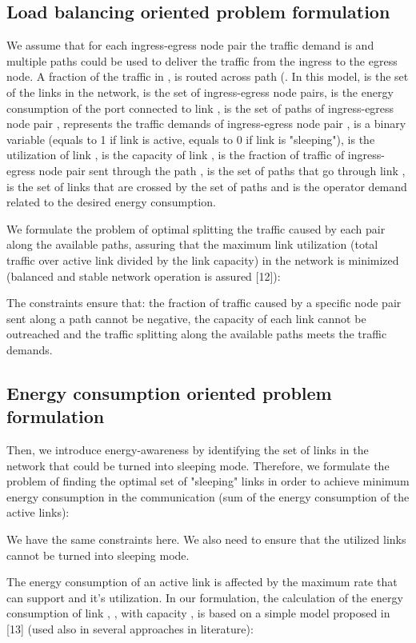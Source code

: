 \documentclass[journal]{IEEEtran}
\begin{document}
\subsection{Load balancing oriented problem formulation}
We assume that for each ingress-egress node pair  the traffic demand is  and multiple paths  could be used to deliver the traffic from the ingress to the egress node. A fraction of the traffic in ,  is routed across path  (. In this model,  is the set of the links in the network,  is the set of ingress-egress node pairs,  is the energy consumption of the port connected to link ,  is the set of paths of ingress-egress node pair ,  represents the traffic demands of ingress-egress node pair ,  is a binary variable (equals to 1 if link  is active, equals to 0 if link  is "sleeping"),  is the utilization of link ,  is the capacity of link ,  is the fraction of traffic of ingress-egress node pair  sent through the path ,  is the set of paths that go through link ,  is the set of links that are crossed by the set of paths  and  is the operator demand related to the desired energy consumption.

We formulate the problem of optimal splitting the traffic caused by each pair  along the available paths, assuring that the maximum link utilization (total traffic over active link divided by the link capacity) in the network is minimized (balanced and stable network operation is assured [12]):

The constraints ensure that: the fraction of traffic caused by a specific node pair  sent along a path cannot be negative, the capacity of each link cannot be outreached and the traffic splitting along the available paths meets the traffic demands.

\subsection{Energy consumption oriented problem formulation}
Then, we introduce energy-awareness by identifying the set of links in the network that could be turned into sleeping mode. Therefore, we formulate the problem of finding the optimal set of "sleeping" links in order to achieve minimum energy consumption in the communication (sum of the energy consumption of the active links):

We have the same constraints here. We also need to ensure that the utilized links cannot be turned into sleeping mode.

The energy consumption of an active link is affected by the maximum rate that can support and it's utilization. In our formulation, the calculation of the energy consumption of link , , with capacity , is based on a simple model proposed in [13] (used also in several approaches in literature):
\end{document}
